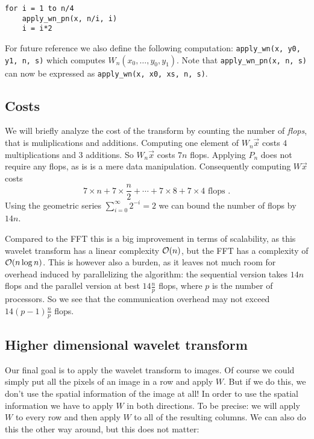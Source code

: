 \begin{lstlisting}
for i = 1 to n/4
	apply_wn_pn(x, n/i, i)
	i = i*2
\end{lstlisting}

For future reference we also define the following computation: \texttt{apply\_wn(x, y0, y1, n, s)} which computes $W_n (x_0, \ldots, y_0, y_1)$. Note that \texttt{apply\_wn\_pn(x, n, s)} can now be expressed as \texttt{apply\_wn(x, x0, xs, n, s)}.


\subsection{Costs}
We will briefly analyze the cost of the transform by counting the number of \emph{flops}, that is muliplications and additions. Computing one element of $W_n \vec{x}$ costs $4$ multiplications and $3$ additions. So $W_n \vec{x}$ costs $7n$ flops. Applying  $P_n$ does not require any flops, as is is a mere data manipulation. Consequently computing $W \vec{x}$ costs
\[ 7 \times n + 7 \times \frac{n}{2} + \cdots +  7 \times 8 + 7 \times 4 \text{ flops }. \]
Using the geometric series $\sum_{i=0}^\infty 2^{-i} = 2$ we can bound the number of flops by $14n$.

Compared to the FFT this is a big improvement in terms of scalability, as this wavelet transform has a linear complexity $\mathcal{O}(n)$, but the FFT has a complexity of $\mathcal{O}(n \log n)$. This is however also a burden, as it leaves not much room for overhead induced by parallelizing the algorithm: the sequential version takes $14n$ flops and the parallel version at best $14\frac{n}{p}$ flops, where $p$ is the number of processors. So we see that the communication overhead may not exceed $14(p-1)\frac{n}{p}$ flops.


\subsection{Higher dimensional wavelet transform}
Our final goal is to apply the wavelet transform to images. Of course we could simply put all the pixels of an image in a row and apply $W$. But if we do this, we don't use the spatial information of the image at all! In order to use the spatial information we have to apply $W$ in both directions. To be precise: we will apply $W$ to every row and then apply $W$ to all of the resulting columns. We can also do this the other way around, but this does not matter:

